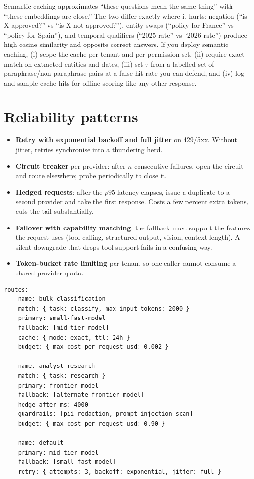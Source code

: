 \documentclass[11pt,twoside,openright]{book}
\theoremstyle{definition}
\theoremstyle{plain}
\theoremstyle{remark}
\newcommand{\code}[1]{\texttt{\small #1}}
\newcommand{\term}[1]{\textbf{#1}}
\begin{document}
\begin{caution}
Semantic caching approximates ``these questions mean the same thing'' with
``these embeddings are close.'' The two differ exactly where it hurts:
negation (``is X approved?'' vs ``is X not approved?''), entity swaps
(``policy for France'' vs ``policy for Spain''), and temporal qualifiers
(``2025 rate'' vs ``2026 rate'') produce high cosine similarity and opposite
correct answers. If you deploy semantic caching, (i) scope the cache per tenant
and per permission set, (ii) require exact match on extracted entities and
dates, (iii) set $\tau$ from a labelled set of paraphrase/non-paraphrase pairs
at a false-hit rate you can defend, and (iv) log and sample cache hits for
offline scoring like any other response.
\end{caution}

\section{Reliability patterns}

\begin{itemize}[leftmargin=1.4em]
  \item \term{Retry with exponential backoff and full jitter} on 429/5xx.
        Without jitter, retries synchronise into a thundering herd.
  \item \term{Circuit breaker} per provider: after $n$ consecutive failures,
        open the circuit and route elsewhere; probe periodically to close it.
  \item \term{Hedged requests}: after the $p95$ latency elapses, issue a
        duplicate to a second provider and take the first response. Costs a few
        percent extra tokens, cuts the tail substantially.
  \item \term{Failover with capability matching}: the fallback must support the
        features the request uses (tool calling, structured output, vision,
        context length). A silent downgrade that drops tool support fails in a
        confusing way.
  \item \term{Token-bucket rate limiting} per tenant so one caller cannot consume
        a shared provider quota.
\end{itemize}

\begin{lstlisting}[style=yaml, caption={A declarative routing policy. The point
is that this is configuration reviewed like code, not \code{if} statements
scattered through the application.}]
routes:
  - name: bulk-classification
    match: { task: classify, max_input_tokens: 2000 }
    primary: small-fast-model
    fallback: [mid-tier-model]
    cache: { mode: exact, ttl: 24h }
    budget: { max_cost_per_request_usd: 0.002 }

  - name: analyst-research
    match: { task: research }
    primary: frontier-model
    fallback: [alternate-frontier-model]
    hedge_after_ms: 4000
    guardrails: [pii_redaction, prompt_injection_scan]
    budget: { max_cost_per_request_usd: 0.90 }

  - name: default
    primary: mid-tier-model
    fallback: [small-fast-model]
    retry: { attempts: 3, backoff: exponential, jitter: full }
\end{lstlisting}
\end{document}
